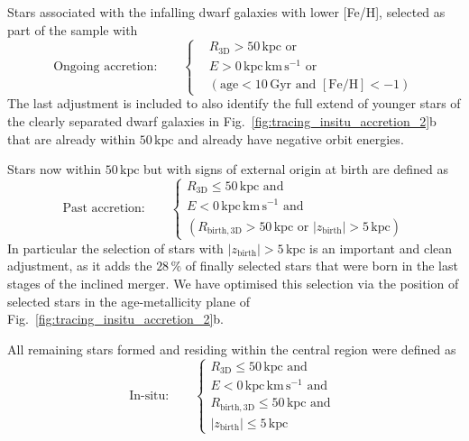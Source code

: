 \documentclass[fleqn,usenatbib]{mnras}
\begin{document}
Stars associated with the infalling dwarf galaxies with lower [Fe/H], selected as part of the sample with
\begin{equation}
\text{Ongoing accretion:} \qquad
\begin{cases}
&R_\mathrm{3D} > 50\,\mathrm{kpc} \text{ or }\\
&E > 0\,\mathrm{kpc\,km\,s^{-1}} \text{ or } \\
&( \mathrm{age} < 10\,\mathrm{Gyr} \text{ and }  [\mathrm{Fe}/\mathrm{H}] < -1 )
\end{cases}
\end{equation}
The last adjustment is included to also identify the full extend of younger stars of the clearly separated dwarf galaxies in Fig.~\ref{fig:tracing_insitu_accretion_2}b that are already within $50\,\mathrm{kpc}$ and already have negative orbit energies.

Stars now within $50\,\mathrm{kpc}$ but with signs of external origin at birth are defined as
\begin{equation} \label{eq:selection_past_accretion}
    \text{Past accretion:} \qquad \begin{cases}
    R_{\mathrm{3D}} \leq 50\,\mathrm{kpc} \text{ and }\\
    E < 0\,\mathrm{kpc\,km\,s^{-1}} \text{ and } \\
    ( R_{\mathrm{birth}, \mathrm{3D}} > 50\,\mathrm{kpc} \text{ or } |z_{\mathrm{birth}}| > 5\,\mathrm{kpc} )
    \end{cases}
\end{equation}
In particular the selection of stars with $|z_{\mathrm{birth}}| > 5\,\mathrm{kpc}$ is an important and clean adjustment, as it adds the $28\,\%$ of finally selected stars that were born in the last stages of the inclined merger. We have optimised this selection via the position of selected stars in the age-metallicity plane of Fig.~\ref{fig:tracing_insitu_accretion_2}b.

All remaining stars formed and residing within the central region were defined as
\begin{equation} \label{eq:selection_insitu}
\text{In-situ:} \qquad
\begin{cases} 
    R_{\mathrm{3D}} \leq 50\,\mathrm{kpc} \text{ and }\\
    E < 0\,\mathrm{kpc\,km\,s^{-1}} \text{ and } \\
    R_{\mathrm{birth}, \mathrm{3D}} \leq 50\,\mathrm{kpc} \text{ and }\\
    |z_{\mathrm{birth}}| \leq 5\,\mathrm{kpc}
\end{cases}
\end{equation}
\end{document}
